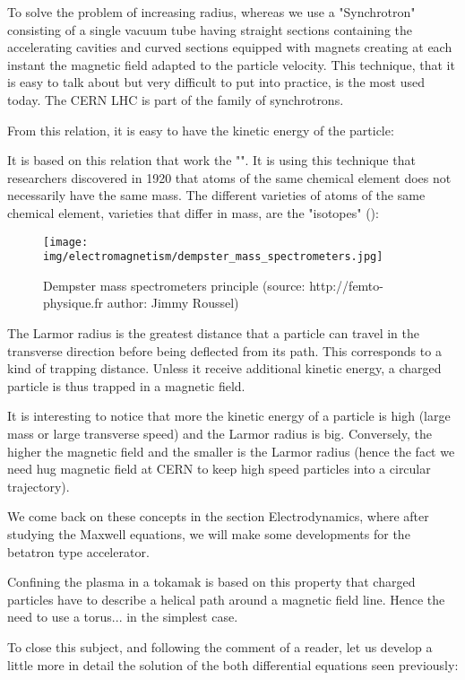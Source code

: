 	To solve the problem of increasing radius, whereas we use a "Synchrotron" consisting of a single vacuum tube having straight sections containing the accelerating cavities and curved sections equipped with magnets creating at each instant the magnetic field adapted to the particle velocity. This technique, that it is easy to talk about but very difficult to put into practice, is the most used today. The CERN LHC is part of the family of synchrotrons.

	From this relation, it is easy to have the kinetic energy of the particle:
	
	It is based on this relation that work the "". It is using this technique that researchers discovered in 1920 that atoms of the same chemical element does not necessarily have the same mass. The different varieties of atoms of the same chemical element, varieties that differ in mass, are the "isotopes" ():
	\begin{figure}[H]
		\centering
		\texttt{[image: img/electromagnetism/dempster\_mass\_spectrometers.jpg]}
		\caption[Dempster mass spectrometers principle]{Dempster mass spectrometers principle (source:  http://femto-physique.fr author: Jimmy Roussel)}
	\end{figure}
	The Larmor radius is the greatest distance that a particle can travel in the transverse direction before being deflected from its path. This corresponds to a kind of trapping distance. Unless it receive additional kinetic energy, a charged particle is thus trapped in a magnetic field.
	
	It is interesting to notice that more the kinetic energy of a particle is high (large mass or large transverse speed) and the Larmor radius is big. Conversely, the higher the magnetic field and the smaller is the Larmor radius (hence the fact we need hug magnetic field at CERN to keep high speed particles into a circular trajectory).

	We come back on these concepts in the section Electrodynamics, where after studying the Maxwell equations, we will make some developments for the betatron type accelerator.
	\begin{tcolorbox}[title=Remark,colframe=black,arc=10pt]
	Confining the plasma in a tokamak is based on this property that charged particles have to describe a helical path around a magnetic field line. Hence the need to use a torus... in the simplest case.
	\end{tcolorbox}
	To close this subject, and following the comment of a reader, let us develop a little more in detail the solution of the both differential equations seen previously:
	
